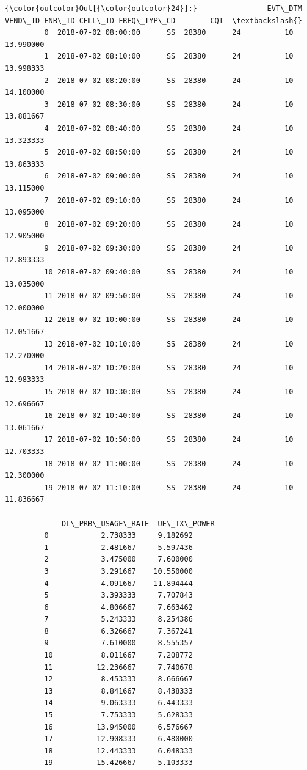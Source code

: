 \documentclass[11pt]{article}
\begin{document}
\begin{Verbatim}[commandchars=\\\{\}]
{\color{outcolor}Out[{\color{outcolor}24}]:}                EVT\_DTM VEND\_ID ENB\_ID CELL\_ID FREQ\_TYP\_CD        CQI  \textbackslash{}
         0  2018-07-02 08:00:00      SS  28380      24          10  13.990000   
         1  2018-07-02 08:10:00      SS  28380      24          10  13.998333   
         2  2018-07-02 08:20:00      SS  28380      24          10  14.100000   
         3  2018-07-02 08:30:00      SS  28380      24          10  13.881667   
         4  2018-07-02 08:40:00      SS  28380      24          10  13.323333   
         5  2018-07-02 08:50:00      SS  28380      24          10  13.863333   
         6  2018-07-02 09:00:00      SS  28380      24          10  13.115000   
         7  2018-07-02 09:10:00      SS  28380      24          10  13.095000   
         8  2018-07-02 09:20:00      SS  28380      24          10  12.905000   
         9  2018-07-02 09:30:00      SS  28380      24          10  12.893333   
         10 2018-07-02 09:40:00      SS  28380      24          10  13.035000   
         11 2018-07-02 09:50:00      SS  28380      24          10  12.000000   
         12 2018-07-02 10:00:00      SS  28380      24          10  12.051667   
         13 2018-07-02 10:10:00      SS  28380      24          10  12.270000   
         14 2018-07-02 10:20:00      SS  28380      24          10  12.983333   
         15 2018-07-02 10:30:00      SS  28380      24          10  12.696667   
         16 2018-07-02 10:40:00      SS  28380      24          10  13.061667   
         17 2018-07-02 10:50:00      SS  28380      24          10  12.703333   
         18 2018-07-02 11:00:00      SS  28380      24          10  12.300000   
         19 2018-07-02 11:10:00      SS  28380      24          10  11.836667   
         
             DL\_PRB\_USAGE\_RATE  UE\_TX\_POWER  
         0            2.738333     9.182692  
         1            2.481667     5.597436  
         2            3.475000     7.600000  
         3            3.291667    10.550000  
         4            4.091667    11.894444  
         5            3.393333     7.707843  
         6            4.806667     7.663462  
         7            5.243333     8.254386  
         8            6.326667     7.367241  
         9            7.610000     8.555357  
         10           8.011667     7.208772  
         11          12.236667     7.740678  
         12           8.453333     8.666667  
         13           8.841667     8.438333  
         14           9.063333     6.443333  
         15           7.753333     5.628333  
         16          13.945000     6.576667  
         17          12.908333     6.480000  
         18          12.443333     6.048333  
         19          15.426667     5.103333  
\end{Verbatim}
            
\end{document}
